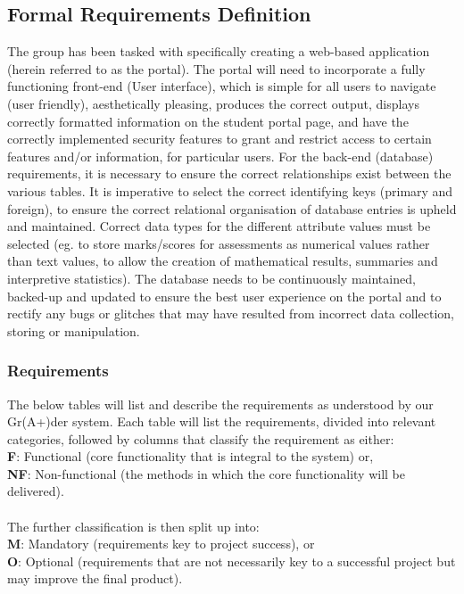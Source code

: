 \documentclass[paper=a4, fontsize=11pt]{scrartcl}
\numberwithin{equation}{section}		%
\numberwithin{figure}{section}			%
\numberwithin{table}{section}				%
\begin{document}
\subsection{Formal Requirements Definition}
The group has been tasked with specifically creating a web-based application (herein
referred to as the portal). The portal will need to incorporate a fully functioning front-end
(User interface), which is simple for all users to navigate (user friendly), aesthetically
pleasing, produces the correct output, displays correctly formatted information on the student
portal page, and have the correctly implemented security features to grant and restrict
access to certain features and/or information, for particular users.
For the back-end (database) requirements, it is necessary to ensure the correct relationships
exist between the various tables. It is imperative to select the correct identifying keys
(primary and foreign), to ensure the correct relational organisation of database entries is
upheld and maintained. Correct data types for the different attribute values must be selected
(eg. to store marks/scores for assessments as numerical values rather than text values, to
allow the creation of mathematical results, summaries and interpretive statistics). The
database needs to be continuously maintained, backed-up and updated to ensure the best
user experience on the portal and to rectify any bugs or glitches that may have resulted from
incorrect data collection, storing or manipulation.

\subsubsection{Requirements}

The below tables will list and describe the requirements as understood by our Gr(A+)der system. Each table will list the requirements, divided into relevant categories, followed by columns that classify the requirement as either:\\
\textbf{F}: Functional (core functionality that is integral to the system) or,\\\textbf{NF}: Non-functional (the methods in which the core functionality will be delivered).\\\\ The further classification is then split up into:\\
\textbf{M}: Mandatory (requirements key to project success), or\\\textbf{O}: Optional (requirements that are not necessarily key to a successful project but may improve the final product).\\\\
\end{document}
